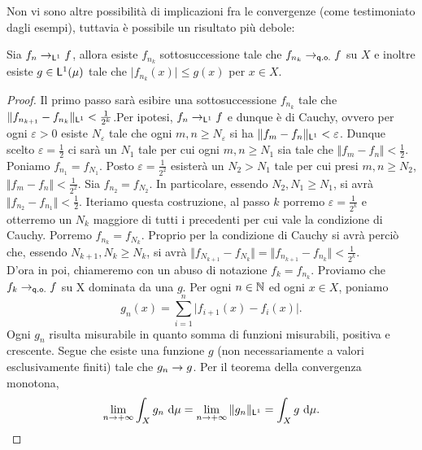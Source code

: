 \documentclass[Completo.tex]{subfiles}
\begin{document}
	Non vi sono altre possibilità di implicazioni fra le convergenze (come testimoniato dagli esempi), tuttavia è possibile un risultato più debole:
	\begin{eTh}
		Sia $f_n \ra_{\sf[L]^1} f$, allora esiste $f_{n_k}$ sottosuccessione tale che $f_{n_k} \ra_{\sf[q.o.]} f$ su $X$ e inoltre esiste $g \in \sf[L]^1(\mu)$ tale che $\vert f_{n_k}(x) \vert \leq g(x)$ per $x \in X$.
	\end{eTh}
	\begin{proof}
		Il primo passo sarà esibire una sottosuccessione $f_{n_k}$ tale che $\Vert f_{n_{k+1}} - f_{n_k} \Vert_{\sf[L]^1} < \frac{1}{2^k}$.Per ipotesi, $f_n \ra_{\sf[L]^1} f$ e dunque è di Cauchy, ovvero per ogni $\varepsilon > 0$ esiste $N_{\varepsilon}$ tale che ogni $m, n \geq N_{\varepsilon}$ si ha $\Vert f_m - f_n \Vert_{\sf[L]^1} < \varepsilon$. Dunque scelto $\varepsilon = \frac{1}{2}$ ci sarà un $N_1$ tale per cui ogni $m, n \geq N_1$ sia tale che $\Vert f_m - f_n \Vert < \frac{1}{2}$. Poniamo $f_{n_1} = f_{N_1}$. Posto $\varepsilon = \frac{1}{2^2}$ esisterà un $N_2 > N_1$ tale per cui presi $m, n \geq N_2$, $\Vert f_m - f_n \Vert < \frac{1}{2^2}$. Sia $f_{n_2} = f_{N_2}$. In particolare, essendo $N_2, N_1 \geq N_1$, si avrà $\Vert f_{n_2} - f_{n_1} \Vert < \frac{1}{2}$. Iteriamo questa costruzione, al passo $k$ porremo $\varepsilon = \frac{1}{2^k}$ e otterremo un $N_k$ maggiore di tutti i precedenti per cui vale la condizione di Cauchy. Porremo $f_{n_k} = f_{N_k}$. Proprio per la condizione di Cauchy si avrà perciò che, essendo $N_{k+1}, N_k \geq N_k$, si avrà $\Vert f_{N_{k+1}} - f_{N_k} \Vert = \Vert f_{n_{k+1}} - f_{n_k} \Vert < \frac{1}{2^k}$. \\
		D'ora in poi, chiameremo con un abuso di notazione $f_k = f_{n_k}$. Proviamo che $f_k \ra_{\sf[q.o.]} f$ su X dominata da una $g$. Per ogni $n \in \bb[N]$ ed ogni $x \in X$, poniamo
		\begin{equation*}
		g_n(x) = \sum_{i = 1}^{n} \vert f_{i+1}(x) - f_i(x) \vert.
		\end{equation*}
		Ogni $g_n$ risulta misurabile in quanto somma di funzioni misurabili, positiva e crescente. Segue che esiste una funzione $g$ (non necessariamente a valori esclusivamente finiti) tale che $g_n \rightarrow g$. Per il teorema della convergenza monotona,
		\begin{equation*}
		\lim_{n \ra +\infty} \int_X g_n \ \mathrm{d}\mu = \lim_{n \ra +\infty} \Vert g_n \Vert_{\sf[L]^1} = \int_X g \ \mathrm{d}\mu.
		\end{equation*}

\end{proof}
\end{document}
